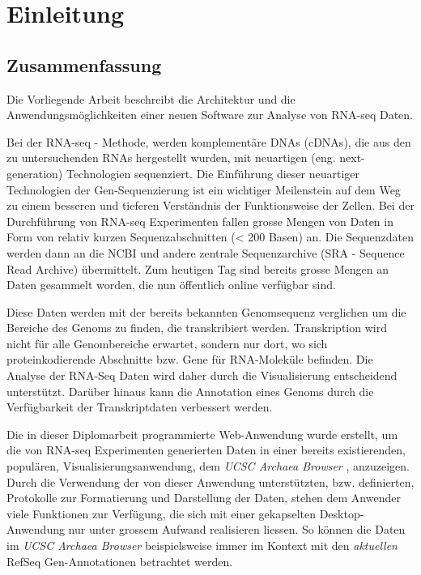 \documentclass[a4paper]{thesis}
\begin{document}

\renewcommand\contentsname{Inhalt}
\tableofcontents
\listoftodos
\newpage
\section{Einleitung}
\subsection{Zusammenfassung}
Die Vorliegende Arbeit beschreibt die Architektur und die
Anwendungsmöglichkeiten einer neuen Software zur Analyse von RNA-seq Daten.

Bei der RNA-seq - Methode, werden komplementäre DNAs (cDNAs), die aus den zu
untersuchenden RNAs hergestellt wurden, mit neuartigen (eng. next-generation)
Technologien sequenziert. \cite{ausubel_rna-seq:_2010}
%
Die Einführung dieser neuartiger Technologien der Gen-Sequenzierung
ist ein wichtiger Meilenstein auf dem Weg zu einem besseren und
tieferen Verständnis der Funktionsweise der Zellen. Bei der Durchführung
von RNA-seq Experimenten fallen grosse Mengen von Daten in Form von
relativ kurzen Sequenzabschnitten (< 200 Basen) an. Die Sequenzdaten
werden dann an die NCBI und andere zentrale Sequenzarchive (SRA -
Sequence Read Archive) übermittelt. Zum heutigen Tag sind bereits
grosse Mengen an Daten gesammelt worden, die nun öffentlich
online verfügbar sind.

Diese Daten werden mit der bereits bekannten
Genomsequenz verglichen um die Bereiche des Genoms zu finden,
die transkribiert werden. Transkription wird nicht für
alle Genombereiche erwartet, sondern nur dort, wo sich proteinkodierende
Abschnitte bzw. Gene für RNA-Moleküle befinden. Die Analyse der RNA-Seq
Daten wird daher durch die Visualisierung entscheidend
unterstützt. Darüber hinaus kann die Annotation eines Genoms durch die
Verfügbarkeit der Transkriptdaten verbessert werden.

Die in dieser Diplomarbeit programmierte Web-Anwendung wurde erstellt, um
die von RNA-seq
Experimenten generierten Daten in einer bereits existierenden, populären,
Visualisierungsanwendung, dem {\em UCSC Archaea Browser}
\cite{schneider_ucsc_2006}, anzuzeigen. Durch die Verwendung der von dieser
Anwendung unterstützten, bzw. definierten, Protokolle zur Formatierung
und Darstellung der Daten, stehen dem Anwender viele Funktionen zur
Verfügung, die sich mit einer gekapselten Desktop-Anwendung nur unter
grossem Aufwand realisieren liessen. So können die Daten im {\em UCSC Archaea
Browser} beispielsweise immer im Kontext mit den {\em aktuellen} RefSeq
Gen-Annotationen betrachtet werden.
\end{document}

